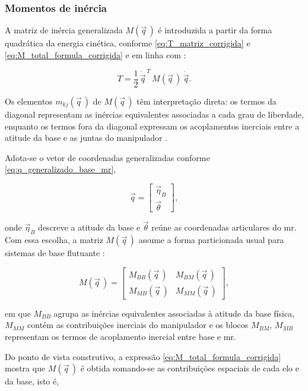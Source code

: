 \subsubsection{Momentos de inércia}
\label{sec:dinAcoplada_momentos_inercia}

A matriz de inércia generalizada $M(\vec q\,)$ é introduzida a partir da
forma quadrática da energia cinética, conforme
\eqref{eq:T_matriz_corrigida} e \eqref{eq:M_total_formula_corrigida} e em
linha com \cite{spong2006robot,featherstone2008}:

\begin{equation}
T =
\frac{1}{2}\,\dot{\vec q}^{\,T}\,M(\vec q\,)\,\dot{\vec q}.
\end{equation}

Os elementos $m_{kj}(\vec q\,)$ de $M(\vec q\,)$ têm interpretação direta:
os termos da diagonal representam as inércias equivalentes associadas a
cada grau de liberdade, enquanto os termos fora da diagonal expressam os
acoplamentos inerciais entre a atitude da base e as juntas do
manipulador \cite{Geradin2004}.

Adota-se o vetor de coordenadas generalizadas conforme
\eqref{eq:q_generalizado_base_mr},

\begin{equation}
\vec q
=
\begin{bmatrix}
\vec\eta_B \\
\vec\theta
\end{bmatrix},
\end{equation}

onde $\vec\eta_B$ descreve a atitude da base e $\vec\theta$ reúne as
coordenadas articulares do \gls{mr}. Com essa escolha, a matriz
$M(\vec q\,)$ assume a forma particionada usual para sistemas de base
flutuante \cite{featherstone2008,Wilde2018}:

\begin{equation}
M(\vec q\,) =
\begin{bmatrix}
M_{BB}(\vec q\,) & M_{BM}(\vec q\,) \\
M_{MB}(\vec q\,) & M_{MM}(\vec q\,)
\end{bmatrix},
\label{eq:M_blocos}
\end{equation}

em que $M_{BB}$ agrupa as inércias equivalentes associadas à atitude da
base física, $M_{MM}$ contém as contribuições inerciais do manipulador e
os blocos $M_{BM}$, $M_{MB}$ representam os termos de acoplamento
inercial entre base e \gls{mr}.

Do ponto de vista construtivo, a expressão
\eqref{eq:M_total_formula_corrigida} mostra que $M(\vec q\,)$ é obtida
somando-se as contribuições espaciais de cada elo e da base, isto é,

